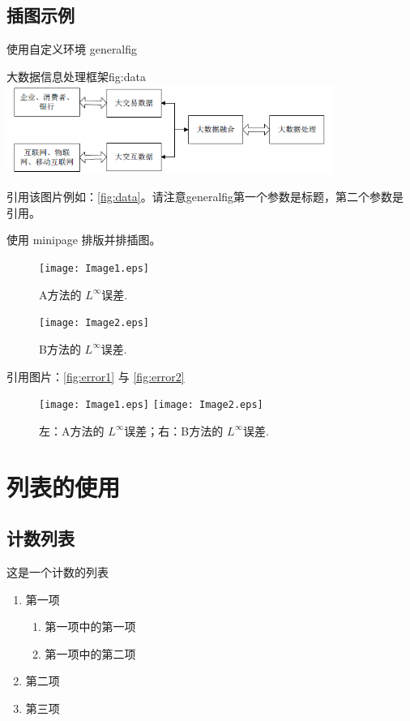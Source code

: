 \documentclass{shnuthesis}
\begin{document}
\section{插图示例}

使用自定义环境 generalfig
	
\begin{generalfig}[htb]{大数据信息处理框架}{fig:data}
		\includegraphics[width=0.8\textwidth]{Figures/data.png}
\end{generalfig}

引用该图片例如：\autoref{fig:data}。请注意generalfig第一个参数是标题，第二个参数是引用。

使用 minipage 排版并排插图。

\begin{figure}[htp!]
\begin{minipage}[h]{0.48\linewidth}
\centering
  \texttt{[image: Image1.eps]}
    \caption{A方法的 $L^\infty$误差.}
    \label{fig:error1}
\end{minipage}
  \hfill
\begin{minipage}[h]{0.48\linewidth}
\centering
   \texttt{[image: Image2.eps]}
   \caption{B方法的 $L^\infty$误差.}
   \label{fig:error2}
\end{minipage}
\end{figure}

引用图片：\autoref{fig:error1} 与 \autoref{fig:error2}

\clearpage
\begin{figure}[htp!]
\centering
  \texttt{[image: Image1.eps]}\hfill
   \texttt{[image: Image2.eps]}
   \caption{左：A方法的 $L^\infty$误差；右：B方法的 $L^\infty$误差.}
   \label{fig:error}
\end{figure}

\chapter{列表的使用}

\section{计数列表}

这是一个计数的列表
\begin{enumerate}
	\item 第一项
		\begin{enumerate}
			\item 第一项中的第一项
			\item 第一项中的第二项
		\end{enumerate}
	\item 第二项
	\item 第三项
\end{enumerate}
\end{document}
